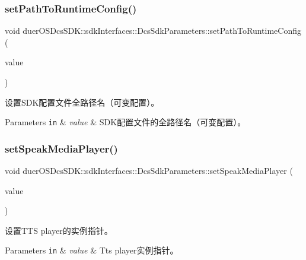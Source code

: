 \subsubsection{\texorpdfstring{set\+Path\+To\+Runtime\+Config()}{setPathToRuntimeConfig()}}
{\footnotesize\ttfamily void duer\+O\+S\+Dcs\+S\+D\+K\+::sdk\+Interfaces\+::\+Dcs\+Sdk\+Parameters\+::set\+Path\+To\+Runtime\+Config (\begin{DoxyParamCaption}\item[{const std\+::string \&}]{value }\end{DoxyParamCaption})\hspace{0.3cm}{\ttfamily [inline]}}



设置\+S\+D\+K配置文件全路径名（可变配置）。 


\begin{DoxyParams}[1]{Parameters}
\mbox{\tt in}  & {\em value} & S\+D\+K配置文件的全路径名（可变配置）。 \\
\hline
\end{DoxyParams}
\mbox{\label{structduerOSDcsSDK_1_1sdkInterfaces_1_1DcsSdkParameters_a5f35981ec0f7f048c658dd5778c877af}} 
\subsubsection{\texorpdfstring{set\+Speak\+Media\+Player()}{setSpeakMediaPlayer()}}
{\footnotesize\ttfamily void duer\+O\+S\+Dcs\+S\+D\+K\+::sdk\+Interfaces\+::\+Dcs\+Sdk\+Parameters\+::set\+Speak\+Media\+Player (\begin{DoxyParamCaption}\item[{std\+::shared\+\_\+ptr$<$ \hyperlink{classduerOSDcsSDK_1_1sdkInterfaces_1_1MediaPlayerInterface}{Media\+Player\+Interface} $>$}]{value }\end{DoxyParamCaption})\hspace{0.3cm}{\ttfamily [inline]}}



设置\+T\+TS player的实例指针。 


\begin{DoxyParams}[1]{Parameters}
\mbox{\tt in}  & {\em value} & Tts player实例指针。 \\
\hline
\end{DoxyParams}
